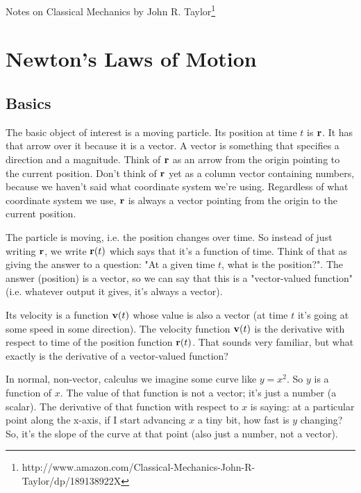 \renewcommand{\a}{\vec{a}}
\renewcommand{\b}{\vec{b}}
\renewcommand{\p}{\vec{p}}
\renewcommand{\vector}[1]{\begin{bmatrix}#1\end{bmatrix}}



Notes on Classical Mechanics by John R. Taylor\footnote{http://www.amazon.com/Classical-Mechanics-John-R-Taylor/dp/189138922X}


\section{Newton's Laws of Motion}






\subsection{Basics}

The basic object of interest is a moving particle. Its position at time $t$ is
$\mathbf{r}$. It has that arrow over it because it is a vector. A vector is something
that specifies a direction and a magnitude. Think of $\mathbf{r}$ as an arrow from the
origin pointing to the current position. Don't think of $\mathbf{r}$ yet as a column
vector containing numbers, because we haven't said what coordinate system we're
using. Regardless of what coordinate system we use, $\mathbf{r}$ is always a vector
pointing from the origin to the current position.

The particle is moving, i.e. the position changes over time. So instead of just
writing $\mathbf{r}$, we write $\mathbf{r}(t)$ which says that it's a function of time. Think
of that as giving the answer to a question: "At a given time $t$, what is the
position?". The answer (position) is a vector, so we can say that this is a
"vector-valued function" (i.e. whatever output it gives, it's always a vector).

Its velocity is a function $\mathbf v(t)$ whose value is also a vector (at time $t$
it's going at some speed in some direction). The velocity function $\mathbf v(t)$ is
the derivative with respect to time of the position function $\mathbf{r}(t)$. That
sounds very familiar, but what exactly is the derivative of a vector-valued
function?

In normal, non-vector, calculus we imagine some curve like $y = x^2$. So $y$ is
a function of $x$. The value of that function is not a vector; it's just a
number (a scalar). The derivative of that function with respect to $x$ is
saying: at a particular point along the x-axis, if I start advancing $x$ a tiny
bit, how fast is $y$ changing? So, it's the slope of the curve at that point
(also just a number, not a vector).

